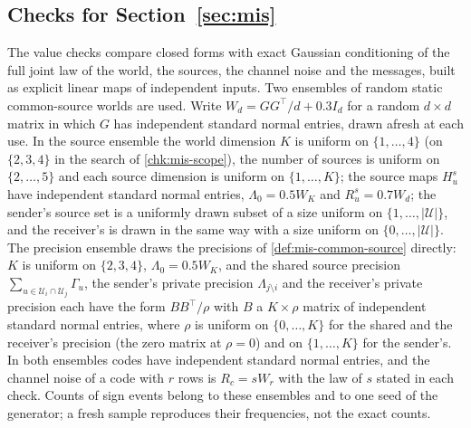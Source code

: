 \subsection{Checks for \texorpdfstring{Section~\ref{sec:mis}}{misreading}}\label{chk:mis}

The value checks compare closed forms with exact Gaussian conditioning of the full joint law of the world, the sources, the channel noise and the messages, built as explicit linear maps of independent inputs. Two ensembles of random static common-source worlds are used. Write $W_d=GG^\top/d+0.3I_d$ for a random $d\times d$ matrix in which $G$ has independent standard normal entries, drawn afresh at each use. In the source ensemble the world dimension $K$ is uniform on $\{1,\dots,4\}$ (on $\{2,3,4\}$ in the search of \cref{chk:mis-scope}), the number of sources is uniform on $\{2,\dots,5\}$ and each source dimension is uniform on $\{1,\dots,K\}$; the source maps $H^s_u$ have independent standard normal entries, $\Lambda_0=0.5W_K$ and $R^s_u=0.7W_d$; the sender's source set is a uniformly drawn subset of a size uniform on $\{1,\dots,\lvert\mathcal U\rvert\}$, and the receiver's is drawn in the same way with a size uniform on $\{0,\dots,\lvert\mathcal U\rvert\}$. The precision ensemble draws the precisions of \cref{def:mis-common-source} directly: $K$ is uniform on $\{2,3,4\}$, $\Lambda_0=0.5W_K$, and the shared source precision $\sum_{u\in\mathcal U_i\cap\mathcal U_j}\Gamma_u$, the sender's private precision $\Lambda_{j\setminus i}$ and the receiver's private precision each have the form $BB^\top/\rho$ with $B$ a $K\times\rho$ matrix of independent standard normal entries, where $\rho$ is uniform on $\{0,\dots,K\}$ for the shared and the receiver's precision (the zero matrix at $\rho=0$) and on $\{1,\dots,K\}$ for the sender's. In both ensembles codes have independent standard normal entries, and the channel noise of a code with $r$ rows is $R_c=sW_r$ with the law of $s$ stated in each check. Counts of sign events belong to these ensembles and to one seed of the generator; a fresh sample reproduces their frequencies, not the exact counts.

